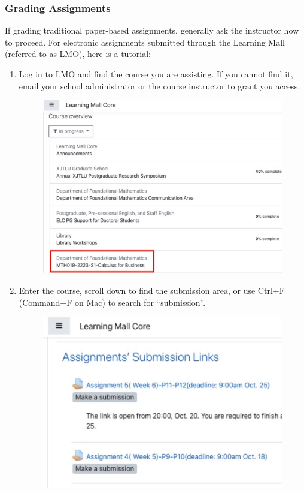\subsubsection{Grading Assignments}
If grading traditional paper-based assignments, generally ask the instructor how to proceed. For electronic assignments submitted through the Learning Mall (referred to as LMO), here is a tutorial:
\begin{enumerate}
    \item Log in to LMO and find the course you are assisting. If you cannot find it, email your school administrator or the course instructor to grant you access.
    \begin{figure}[H]
        \centering
        \includegraphics[width=0.4\columnwidth]{author-folder/Kai.Wu/LMO_course.jpg}
    \end{figure}

    \item 
    \begin{minipage}{0.3\textwidth}
        Enter the course, scroll down to find the submission area, or use Ctrl+F (Command+F on Mac) to search for “submission”.
    \end{minipage}
    \begin{minipage}{0.63\textwidth}
        \begin{figure}[H]
            \includegraphics[width=0.95\columnwidth, right]{author-folder/Kai.Wu/LMO_submission_links.jpg}
        \end{figure}
    \end{minipage}


\end{enumerate}
